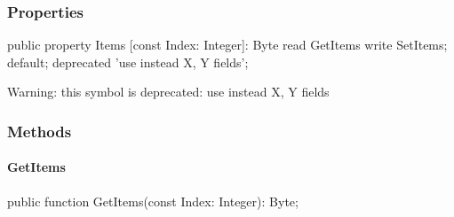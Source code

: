 \documentclass{report}
\newif\ifpdf
\begin{document}
\subsubsection*{\large{\textbf{Properties}}\normalsize\hspace{1ex}\hfill}
\begin{list}{}{
\setlength{\itemindent}{0cm}
\setlength{\listparindent}{0cm}
\setlength{\leftmargin}{\evensidemargin}
\addtolength{\leftmargin}{\tmplength}
\settowidth{\labelsep}{X}
\addtolength{\leftmargin}{\labelsep}
\setlength{\labelwidth}{\tmplength}
}
\label{ok_deprecated_default.TMyClass-Items}
\item[\textbf{Items}\hfill]
\ifpdf
\begin{flushleft}
\fi
\begin{ttfamily}
public property Items [const Index: Integer]: Byte read GetItems write SetItems; default; deprecated 'use instead X, Y fields';\end{ttfamily}

\ifpdf
\end{flushleft}
\fi


\par Warning: this symbol is deprecated: use instead X, Y fields

 \end{list}
\subsubsection*{\large{\textbf{Methods}}\normalsize\hspace{1ex}\hfill}
\paragraph*{GetItems}\hspace*{\fill}

\label{ok_deprecated_default.TMyClass-GetItems}
\begin{list}{}{
\setlength{\itemindent}{0cm}
\setlength{\listparindent}{0cm}
\setlength{\leftmargin}{\evensidemargin}
\addtolength{\leftmargin}{\tmplength}
\settowidth{\labelsep}{X}
\addtolength{\leftmargin}{\labelsep}
\setlength{\labelwidth}{\tmplength}
}
\item[\textbf{Declaration}\hfill]
\ifpdf
\begin{flushleft}
\fi
\begin{ttfamily}
public function GetItems(const Index: Integer): Byte;\end{ttfamily}

\ifpdf
\end{flushleft}
\fi

\end{list}
\end{document}
